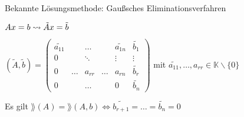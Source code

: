 Bekannte Lösungsmethode: Gaußsches Eliminationsverfahren

$Ax=b \rightsquigarrow \tilde{A}x = \tilde{b} \\$

\(
(\tilde{A},\tilde{b})=
\begin{pmatrix} 
\tilde{a_{11}} & &\dots  &  & \tilde{a_{1n}} & \tilde{b_1} \\
0 & & \ddots &  & \vdots & \vdots \\
0 & \dots & a_{rr} & \dots & a_{rn} & \tilde{b_r} \\
0 & & \dots & & 0 & \tilde{b_n} \end{pmatrix}
\)
mit $\tilde{a_{11}}, \dots, a_{rr} \in \mathbb{K} \backslash \{0\} $

Es gilt $\rang(A)= \rang(A,b) \Leftrightarrow 
\tilde{b_{r+1}} = \dots = \tilde{b_n} = 0$

